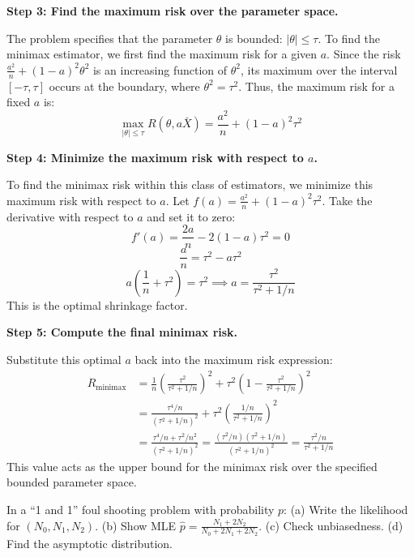 \begin{solution}
\textbf{Step 3: Find the maximum risk over the parameter space.}

The problem specifies that the parameter $\theta$ is bounded: $|\theta| \leq \tau$.
To find the minimax estimator, we first find the maximum risk for a given $a$.
Since the risk $\frac{a^2}{n} + (1-a)^2 \theta^2$ is an increasing function of $\theta^2$, its maximum over the interval $[-\tau, \tau]$ occurs at the boundary, where $\theta^2 = \tau^2$.
Thus, the maximum risk for a fixed $a$ is:
\[ \max_{|\theta| \leq \tau} R(\theta, a\bar{X}) = \frac{a^2}{n} + (1-a)^2 \tau^2 \]

\textbf{Step 4: Minimize the maximum risk with respect to $a$.}

To find the minimax risk within this class of estimators, we minimize this maximum risk with respect to $a$. Let $f(a) = \frac{a^2}{n} + (1-a)^2 \tau^2$.
Take the derivative with respect to $a$ and set it to zero:
\[ f'(a) = \frac{2a}{n} - 2(1-a)\tau^2 = 0 \]
\[ \frac{a}{n} = \tau^2 - a\tau^2 \]
\[ a \left(\frac{1}{n} + \tau^2\right) = \tau^2 \implies a = \frac{\tau^2}{\tau^2 + 1/n} \]
This is the optimal shrinkage factor.

\textbf{Step 5: Compute the final minimax risk.}

Substitute this optimal $a$ back into the maximum risk expression:
\begin{align*}
R_{\text{minimax}} &= \frac{1}{n} \left( \frac{\tau^2}{\tau^2 + 1/n} \right)^2 + \tau^2 \left( 1 - \frac{\tau^2}{\tau^2 + 1/n} \right)^2 \\
&= \frac{\tau^4 / n}{(\tau^2 + 1/n)^2} + \tau^2 \left( \frac{1/n}{\tau^2 + 1/n} \right)^2 \\
&= \frac{\tau^4 / n + \tau^2 / n^2}{(\tau^2 + 1/n)^2} = \frac{(\tau^2/n)(\tau^2 + 1/n)}{(\tau^2 + 1/n)^2} = \frac{\tau^2 / n}{\tau^2 + 1/n}
\end{align*}
This value acts as the upper bound for the minimax risk over the specified bounded parameter space.
\end{solution}

\begin{exercise}\label{probability:2010:10}
In a ``1 and 1'' foul shooting problem with probability $p$:
(a) Write the likelihood for $(N_0, N_1, N_2)$.
(b) Show MLE $\hat{p} = \frac{N_1 + 2N_2}{N_0 + 2N_1 + 2N_2}$.
(c) Check unbiasedness.
(d) Find the asymptotic distribution.
\end{exercise}

